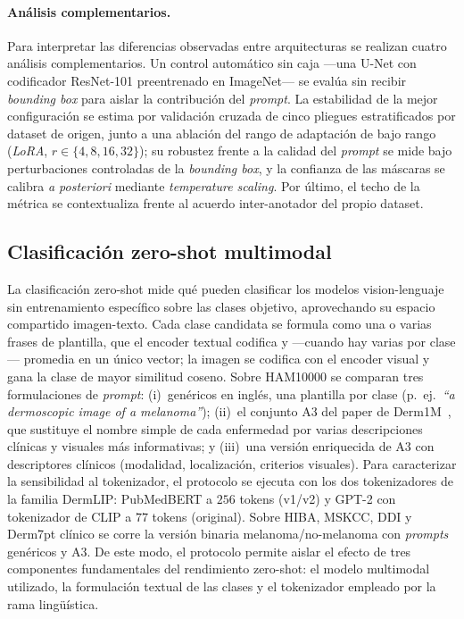 \paragraph{Análisis complementarios.}
Para interpretar las diferencias observadas entre arquitecturas se
realizan cuatro análisis complementarios. Un control automático sin
caja ---una U-Net con codificador ResNet-101 preentrenado en
ImageNet--- se evalúa sin recibir \emph{bounding box} para aislar la
contribución del \emph{prompt}. La estabilidad de la mejor
configuración se estima por validación cruzada de cinco pliegues
estratificados por dataset de origen, junto a una ablación del rango
de adaptación de bajo rango (\emph{LoRA}, $r\in\{4,8,16,32\}$); su
robustez frente a la calidad del \emph{prompt} se mide bajo
perturbaciones controladas de la \emph{bounding box}, y la confianza
de las máscaras se calibra \emph{a posteriori} mediante
\emph{temperature scaling}. Por último, el techo de la métrica se
contextualiza frente al acuerdo inter-anotador del propio dataset.

\subsection{Clasificación zero-shot multimodal}
\label{sec:zs}

La clasificación zero-shot mide qué pueden clasificar los modelos
vision-lenguaje sin entrenamiento específico sobre las clases objetivo,
aprovechando su espacio compartido imagen-texto. Cada clase candidata se
formula como una o varias frases de plantilla, que el encoder textual
codifica y ---cuando hay varias por clase--- promedia en un único
vector; la imagen se codifica con el encoder visual y gana la clase de
mayor similitud coseno. Sobre HAM10000 se comparan tres formulaciones de
\emph{prompt}: (i)~genéricos en inglés, una plantilla por clase
(p.~ej.~\emph{``a dermoscopic image of a melanoma''});
(ii)~el conjunto A3 del paper de Derm1M~\cite{derm1m}, que sustituye el
nombre simple de cada enfermedad por varias descripciones clínicas y
visuales más informativas; y (iii)~una versión enriquecida de A3 con
descriptores clínicos (modalidad, localización, criterios visuales).
Para caracterizar la sensibilidad al tokenizador, el protocolo se
ejecuta con los dos tokenizadores de la familia DermLIP: PubMedBERT
a $256$ tokens (v1/v2) y GPT-2 con tokenizador de CLIP a $77$
tokens (original). Sobre HIBA, MSKCC, DDI y Derm7pt clínico se corre
la versión binaria melanoma/no-melanoma con \emph{prompts}
genéricos y A3. De este modo, el protocolo permite aislar el efecto
de tres componentes fundamentales del rendimiento zero-shot: el
modelo multimodal utilizado, la formulación textual de las clases y
el tokenizador empleado por la rama lingüística.

